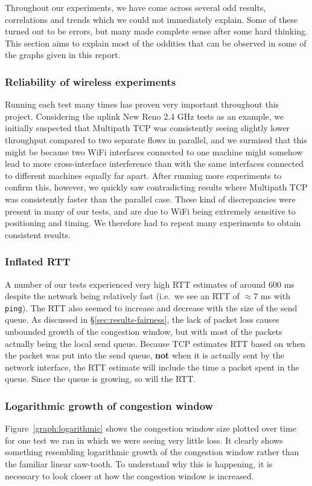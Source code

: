 Throughout our experiments, we have come across several odd results,
correlations and trends which we could not immediately explain. Some of these
turned out to be errors, but many made complete sense after some hard
thinking. This section aims to explain most of the oddities that can be observed
in some of the graphs given in this report.

\subsubsection{Reliability of wireless experiments}
Running each test many times has proven very important throughout this project.
Considering the uplink New Reno 2.4 GHz tests as an example, we initially 
suspected that Multipath TCP was consistently seeing slightly lower 
throughput compared to two separate flows in parallel, and we surmised that
this might be because two 
WiFi interfaces connected to one machine might somehow lead to more 
cross-interface interference than with the same interfaces connected to 
different machines equally far apart. After running more experiments to confirm this, 
however, we quickly saw contradicting results where Multipath TCP was 
consistently faster than the parallel case. These kind of discrepancies were
present in many of our tests, and are due to WiFi being extremely sensitive to
positioning and timing. We therefore had to repeat many experiments to obtain
consistent results. 

\subsubsection{Inflated RTT}
A number of our tests experienced very high RTT estimates of around 600 ms despite the network
being relatively fast (i.e.\ we see an RTT of $\approx 7$ ms with \texttt{ping}).
The RTT also seemed to increase and decrease with the size of the send queue. As 
discussed in \S\ref{sec:results-fairness}, the lack of packet loss causes 
unbounded growth of the congestion window, but with most of the packets actually being
the local send queue. Because TCP estimates RTT based on when the packet was put into 
the send queue, \textbf{not} when it is actually sent by the network interface, 
the RTT estimate will include the time a packet spent in the queue. Since the 
queue is growing, so will the RTT.

\subsubsection{Logarithmic growth of congestion window}
Figure~\ref{graph:logarithmic} shows the congestion window size plotted over
time for one test we ran in which we were seeing very little loss. It clearly
shows something resembling logarithmic growth of the congestion window rather than the familiar linear
saw-tooth. To understand why this is happening, it is necessary to look closer
at how the congestion window is increased.

